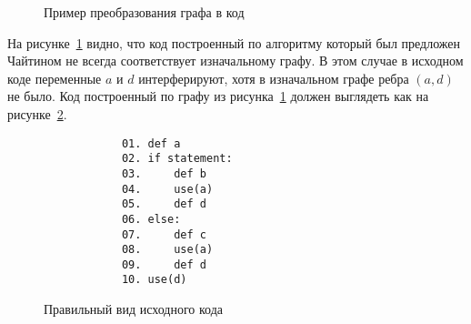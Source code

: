 \begin{example}

    \begin{figure}[h]
        \centering
    \caption{Пример преобразования графа в код}
    \label{fig:ex2}
    \end{figure}

    На рисунке~\ref{fig:ex2} видно, что код построенный по алгоритму который был предложен Чайтином не
    всегда соответствует изначальному графу. В этом случае в исходном коде переменные
    $a$ и $d$ интерферируют, хотя в изначальном графе ребра $(a, d)$ не было. Код построенный
    по графу из рисунка~\ref{fig:ex2} должен выглядеть как на рисунке~\ref{fig:right_ex2}.

    \begin{figure}
        \centering
        \lstset{basicstyle=\ttfamily\small, frame=single}
        \begin{lstlisting}
            01. def a
            02. if statement:
            03.     def b
            04.     use(a)
            05.     def d 
            06. else:
            07.     def c
            08.     use(a)
            09.     def d
            10. use(d)
        \end{lstlisting}
        \caption{Правильный вид исходного кода}
        \label{fig:right_ex2}
    \end{figure}
\end{example}

